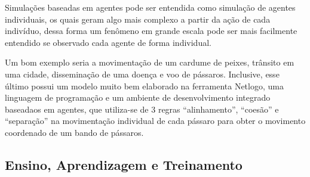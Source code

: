 Simulações baseadas em agentes pode ser entendida como simulação de agentes individuais, os quais geram algo mais complexo a partir da ação de cada indivíduo, dessa forma um fenômeno em grande escala pode ser mais facilmente entendido se observado cada agente de forma individual.

Um bom exemplo seria a movimentação de um cardume de peixes, trânsito em uma cidade, disseminação de uma doença e voo de pássaros. Inclusive, esse último possui um modelo muito bem elaborado na ferramenta Netlogo, uma linguagem de programação e um ambiente de desenvolvimento integrado baseadaos em agentes, que utiliza-se de 3 regras “alinhamento”, “coesão” e “separação” na movimentação individual de cada pássaro para obter o movimento coordenado de um bando de pássaros.

\subsection{Ensino, Aprendizagem e Treinamento}

